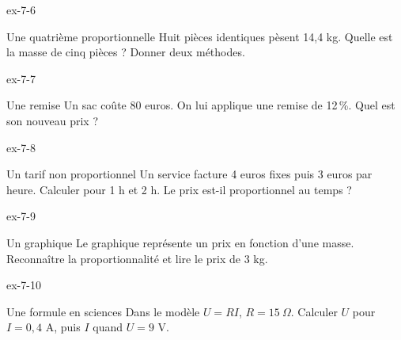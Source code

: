 \begin{blocLivre}{ex-7-6}\begin{exercice}[2]{Une quatrième proportionnelle}
Huit pièces identiques pèsent 14,4 kg. Quelle est la masse de cinq pièces ? Donner deux méthodes.
\end{exercice}\end{blocLivre}
\begin{blocLivre}{ex-7-7}\begin{exercice}[2]{Une remise}
Un sac coûte 80 euros. On lui applique une remise de 12\,\%. Quel est son nouveau prix ?
\end{exercice}\end{blocLivre}
\begin{blocLivre}{ex-7-8}\begin{exercice}[2]{Un tarif non proportionnel}
Un service facture 4 euros fixes puis 3 euros par heure. Calculer pour 1 h et 2 h. Le prix est-il proportionnel au temps ?
\end{exercice}\end{blocLivre}
\begin{blocLivre}{ex-7-9}\begin{exercice}[2]{Un graphique}
Le graphique représente un prix en fonction d’une masse. Reconnaître la proportionnalité et lire le prix de 3 kg.
\label{fig-ex-7-9}
\end{exercice}\end{blocLivre}
\begin{blocLivre}{ex-7-10}\begin{exercice}[2]{Une formule en sciences}
Dans le modèle $U=RI$, $R=15\ \Omega$. Calculer $U$ pour $I=0{,}4$ A, puis $I$ quand $U=9$ V.
\end{exercice}\end{blocLivre}

